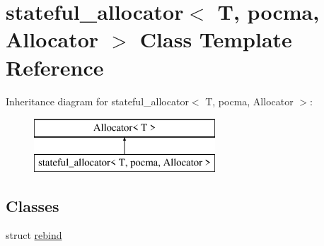 \hypertarget{classstateful__allocator}{}\section{stateful\+\_\+allocator$<$ T, pocma, Allocator $>$ Class Template Reference}
\label{classstateful__allocator}
Inheritance diagram for stateful\+\_\+allocator$<$ T, pocma, Allocator $>$\+:\begin{figure}[H]
\begin{center}
\leavevmode
\includegraphics[height=2.000000cm]{classstateful__allocator}
\end{center}
\end{figure}
\subsection*{Classes}
\begin{DoxyCompactItemize}
\item 
struct \hyperlink{structstateful__allocator_1_1rebind}{rebind}
\end{DoxyCompactItemize}
